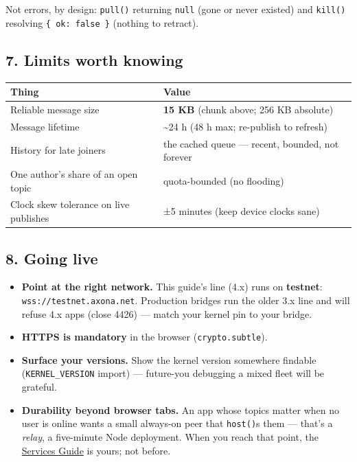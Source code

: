\documentclass[
  nobib]{tufte-handout}
\newcounter{none} %
\providecommand{\tightlist}{%
  \setlength{\itemsep}{0pt}\setlength{\parskip}{0pt}}
\begin{document}
Not errors, by design: \texttt{pull()} returning \texttt{null} (gone or
never existed) and \texttt{kill()} resolving \texttt{\{\ ok:\ false\ \}}
(nothing to retract).

\subsection{7. Limits worth knowing}\label{limits-worth-knowing}

{\def\LTcaptype{none} %
\begin{longtable}[]{@{}
  >{\raggedright\arraybackslash}p{}
  >{\raggedright\arraybackslash}p{}@{}}
\toprule\noalign{}
\begin{minipage}[b]{\linewidth}\raggedright
Thing
\end{minipage} & \begin{minipage}[b]{\linewidth}\raggedright
Value
\end{minipage} \\
\midrule\noalign{}
\endhead
\bottomrule\noalign{}
\endlastfoot
Reliable message size & \textbf{15 KB} (chunk above; 256 KB absolute) \\
Message lifetime & \textasciitilde24 h (48 h max; re-publish to
refresh) \\
History for late joiners & the cached queue --- recent, bounded, not
forever \\
One author's share of an open topic & quota-bounded (no flooding) \\
Clock skew tolerance on live publishes & ±5 minutes (keep device clocks
sane) \\
\end{longtable}
}

\subsection{8. Going live}\label{going-live}

\begin{itemize}
\tightlist
\item
  \textbf{Point at the right network.} This guide's line (4.x) runs on
  \textbf{testnet}: \texttt{wss://testnet.axona.net}. Production bridges
  run the older 3.x line and will refuse 4.x apps (close 4426) --- match
  your kernel pin to your bridge.
\item
  \textbf{HTTPS is mandatory} in the browser (\texttt{crypto.subtle}).
\item
  \textbf{Surface your versions.} Show the kernel version somewhere
  findable (\texttt{KERNEL\_VERSION} import) --- future-you debugging a
  mixed fleet will be grateful.
\item
  \textbf{Durability beyond browser tabs.} An app whose topics matter
  when no user is online wants a small always-on peer that
  \texttt{host()}s them --- that's a \emph{relay}, a five-minute Node
  deployment. When you reach that point, the
  \href{Axona-Services-Guide-v4.16.0.md}{Services Guide} is yours; not
  before.
\end{itemize}
\end{document}
